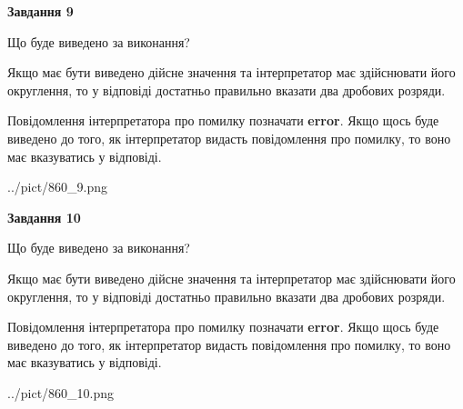 \documentclass[12pt, ukrainian]{article}
\begin{document}
{\begin {Large}
{\begin {center}\textbf{Завдання 9}\end {center}}\par
Що буде виведено за виконання? \par

Якщо має бути виведено дійсне значення та інтерпретатор має здійснювати його округлення, 
то у відповіді достатньо правильно вказати два дробових розряди.

Повідомлення інтерпретатора про помилку позначати \textbf{error}.
Якщо щось буде виведено до того, як інтерпретатор видасть повідомлення про помилку, 
то воно має вказуватись у відповіді. \par

\begin{center}
	{../pict/860_9.png}
\end{center}
\newpage

{\begin {center}\textbf{Завдання 10}\end {center}}\par
Що буде виведено за виконання? \par

Якщо має бути виведено дійсне значення та інтерпретатор має здійснювати його округлення, 
то у відповіді достатньо правильно вказати два дробових розряди.

Повідомлення інтерпретатора про помилку позначати \textbf{error}.
Якщо щось буде виведено до того, як інтерпретатор видасть повідомлення про помилку, 
то воно має вказуватись у відповіді. \par

\begin{center}
	{../pict/860_10.png}
\end{center}
\newpage

\end {Large}}
\end{document}
